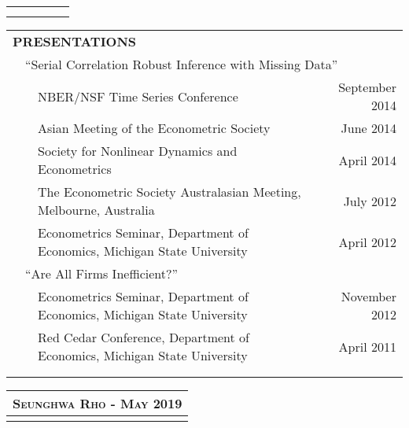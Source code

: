 \documentclass[10pt]{article}
\begin{document}
\begin{center}
\begin{tabular}{llllr}
\multicolumn{5}{p{500pt}}{}\\\\
\end{tabular}
\begin{tabular}{llllr}
\multicolumn{5}{l}{{\Large \textbf{P}}\textbf{RESENTATIONS}}\vspace{0.1cm}\\
&\multicolumn{4}{l}{\textquotedblleft Serial Correlation
Robust Inference with Missing Data\textquotedblright } \\
\multicolumn{1}{l}{} & \multicolumn{1}{l}{} & \multicolumn{2}{l}{
NBER/NSF Time Series Conference} &\multicolumn{1}{r}{September 2014}\\
\multicolumn{1}{l}{} & \multicolumn{1}{l}{} & \multicolumn{2}{l}{
Asian Meeting of the Econometric Society} &\multicolumn{1}{r}{June 2014}\\
\multicolumn{1}{l}{} & \multicolumn{1}{l}{} & \multicolumn{2}{l}{
Society for Nonlinear Dynamics and Econometrics} &\multicolumn{1}{r}{April 2014}\\
\multicolumn{1}{l}{} & \multicolumn{1}{l}{} & \multicolumn{2}{l}{
The Econometric Society Australasian Meeting, Melbourne, Australia} &\multicolumn{1}{r}{July 2012}\\
\multicolumn{1}{l}{} & \multicolumn{1}{l}{} & \multicolumn{2}{l}{
Econometrics Seminar, Department of Economics, Michigan State University} &\multicolumn{1}{r}{April 2012}\vspace{0.2cm}\\
& \multicolumn{4}{l}{ \textquotedblleft Are All Firms Inefficient?\textquotedblright}\\
\multicolumn{1}{l}{} & \multicolumn{1}{l}{} & \multicolumn{2}{l}{
Econometrics Seminar, Department of Economics, Michigan State University} &\multicolumn{1}{r}{November 2012}\\
\multicolumn{1}{l}{} & \multicolumn{1}{l}{} & \multicolumn{2}{l}{
Red Cedar Conference, Department of Economics, Michigan State University} &\multicolumn{1}{r}{April 2011} \\
\multicolumn{5}{p{500pt}}{}\\\\
\end{tabular}
\clearpage

\begin{tabular}{llllr}
\multicolumn{5}{r}{\textsc{Seunghwa Rho - May 2019}} \\ \hline
\multicolumn{5}{p{500pt}}{}\\
\end{tabular}


\end{center}
\end{document}
